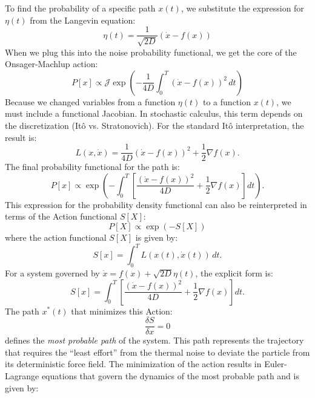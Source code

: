 \documentclass[12pt]{article}
\begin{document}
\begin{singlespace}
To find the probability of a specific path $x(t)$, we substitute the expression for $\eta(t)$ from the Langevin equation:
\begin{equation}
\eta(t) = \frac{1}{\sqrt{2D}} \left( \dot{x} - f(x) \right)
\end{equation}
When we plug this into the noise probability functional, we get the core of the Onsager-Machlup action:
\begin{equation}
P[x] \propto \mathcal{J} \exp\left( -\frac{1}{4D} \int_0^T (\dot{x} - f(x))^2 \, dt \right)
\end{equation}
Because we changed variables from a function $\eta(t)$ to a function $x(t)$, we must include a functional Jacobian. In stochastic calculus, this term depends on the discretization (Itô vs. Stratonovich). For the standard Itô interpretation, the result is:
\begin{equation}
L(x, \dot{x}) = \frac{1}{4D} (\dot{x} - f(x))^2 + \frac{1}{2} \nabla f(x).
\end{equation}
The final probability functional for the path is:
\begin{equation}
P[x] \propto \exp\left( -\int_0^T \left[ \frac{(\dot{x} - f(x))^2}{4D} + \frac{1}{2} \nabla f(x) \right] dt \right).
\end{equation}
This expression for the probability density functional can also be reinterpreted in terms of the Action functional $S[X]$:
\begin{equation}P[X] \propto \exp\left( -S[X] \right)\end{equation}
where the action functional $S[X]$ is given by:
\begin{equation}
S[x] = \int_0^T L(x(t), \dot{x}(t)) \, dt.
\end{equation}
For a system governed by $\dot{x} = f(x) + \sqrt{2D}\eta(t)$, the explicit form is:
\begin{equation}
S[x] = \int_0^T \left[ \frac{(\dot{x} - f(x))^2}{4D} + \frac{1}{2} \nabla f(x) \right] dt.
\end{equation}
The path $x^*(t)$ that minimizes this Action:
\begin{equation}
\frac{\delta S}{\delta x} = 0
\end{equation}
defines the \textit{most probable path} of the system. This path represents the trajectory that requires the ``least effort'' from the thermal noise to deviate the particle from its deterministic force field. The minimization of the action results in Euler-Lagrange equations that govern the dynamics of the most probable path and is given by:

\end{singlespace}
\end{document}
